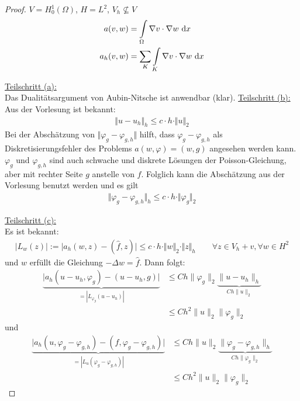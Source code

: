 \begin{proof}
	$V=H_0^1(\Omega)$, $H=L^2$, $V_h\not\subseteq V$
	\begin{align*}
		a(v,w)&=\int\limits_\Omega\nabla v\cdot\nabla w\text{ d} x\\
		a_h(v,w)&=\sum\limits_K\int\limits_K\nabla v\cdot\nabla w\text{ d} x
	\end{align*}

	\underline{Teilschritt (a):}\\
	Das Dualitätsargument von Aubin-Nitsche ist anwendbar (klar).\nl
	\underline{Teilschritt (b):}\\
	Aus der Vorlesung ist bekannt:
	\begin{align*}
		\Vert u-u_h\Vert_h\leq c\cdot h\cdot\Vert u\Vert_2
	\end{align*}
	Bei der Abschätzung von $\Vert\varphi_g-\varphi_{g,h}\Vert$ hilft, dass $\varphi_g-\varphi_{g,h}$ als Diskretisierungsfehler des Problems 
	$a(w,\varphi)=(w,g)$ angesehen werden kann.\nl
	$\varphi_g$ und $\varphi_{g,h}$ sind auch schwache und diskrete Lösungen der Poisson-Gleichung, aber mit rechter Seite $g$ anstelle von $f$. 
	Folglich kann die Abschätzung aus der Vorlesung benutzt werden und es gilt
	\begin{align*}
		\Vert\varphi_g-\varphi_{g,h}\Vert_h\leq c\cdot h\cdot\Vert\varphi_g\Vert_2
	\end{align*}

	\underline{Teilschritt (c):}\\
	Es ist bekannt:
	\begin{align*}
		\big|L_w(z)\big|:=\Big|a_h(w,z)-(\hat{f},z)\Big|\leq c\cdot h\cdot\Vert w\Vert_2\cdot\Vert z\Vert_h\qquad\forall z\in V_h+v,\forall w\in H^2
	\end{align*}
	und $w$ erfüllt die Gleichung $-\Delta w = \hat{f}$.%
	Dann folgt:
	\begin{align*}
		\underbrace{\big|a_h(u-u_h,\varphi_g)-(u-u_h,g)\big|}_{=|L_{\varphi_g}(u-u_h)|} &\leq Ch \|\varphi_g\|_2\underbrace{\|u-u_h\|_h}_{Ch\|u\|_2}\\
		&\leq Ch^2 \|u\|_2\|\varphi_g\|_2
	\end{align*}
	und
	\begin{align*}
		\underbrace{\big|a_h(u,\varphi_g-\varphi_{g,h})-(f,\varphi_g-\varphi_{g,h})\big|}_{=|L_{u}(\varphi_g-\varphi_{g,h})|} &\leq Ch \|u\|_2\underbrace{\|\varphi_g - \varphi_{g,h}\|_h}_{Ch\|\varphi_g\|_2} \\
		&\leq Ch^2 \|u\|_2\|\varphi_g\|_2
	\end{align*}


\end{proof}

